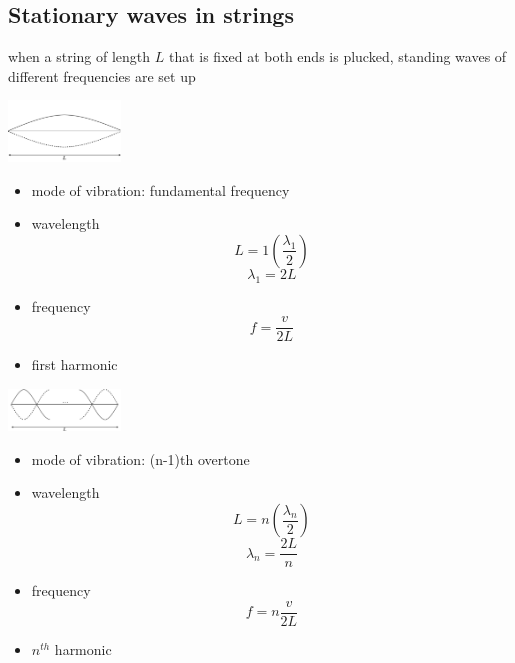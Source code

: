 \documentclass[a4paper, 10pt]{article}
\begin{document}
\subsection{Stationary waves in strings}
when a string of length $L$ that is fixed at both ends is plucked, standing waves of different frequencies are set up \\
\begin{framed}
\begin{minipage}{0.5\textwidth}
   \begin{center}
   \includegraphics[trim = 50 50 50 50, width=3cm]{figures/2.pdf} 
   \end{center}	
\end{minipage}	
\begin{minipage}{0.5\textwidth}
   \begin{itemize}
      \item mode of vibration: fundamental frequency 
      \item wavelength
         \[
            L = 1 \left( \frac{\lambda_1}{2} \right) 
         \]
         \[
         \lambda_1 = 2L
         \]
      \item frequency 
         \[
         f = \frac{v}{2L}
         \]
      \item first harmonic
   \end{itemize}	
\end{minipage}	 
\end{framed}	

\begin{framed}
\begin{minipage}{0.5\textwidth}
   \begin{center}
   \includegraphics[trim = 50 50 50 50, width=3cm]{figures/3.pdf} 
   \end{center}	
\end{minipage}	
\begin{minipage}{0.5\textwidth}
   \begin{itemize}
      \item mode of vibration: (n-1)th overtone 
      \item wavelength
         \[
            L = n \left( \frac{\lambda_n}{2} \right) 
         \]
         \[
         \lambda_n = \frac{2L}{n}
         \]
      \item frequency 
         \[
         f = n \frac{v}{2L}
         \]
      \item $n^{th}$ harmonic
   \end{itemize}	
\end{minipage}	
\end{framed}	
\end{document}
